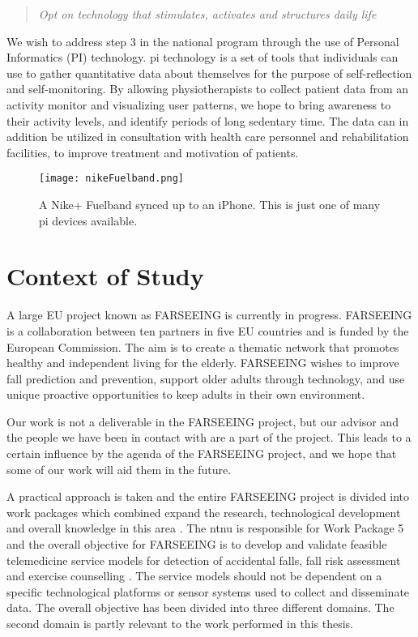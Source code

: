 \begin{quote}
\textit{Opt on technology that stimulates, activates and structures daily life}~\cite[page 120]{haagen}
\end{quote}

We wish to address step 3 in the national program through the use of Personal Informatics (PI) technology. \gls{pi} technology is a set of tools that individuals can use to gather quantitative data about themselves for the purpose of self-reflection and self-monitoring. By allowing physiotherapists to collect patient data from an activity monitor and visualizing user patterns, we hope to bring awareness to their activity levels, and identify periods of long sedentary time. The data can in addition be utilized in consultation with health care personnel and rehabilitation facilities, to improve treatment and motivation of patients.


\begin{figure}[h!]
	\centering
		\texttt{[image: nikeFuelband.png]}
		\caption{\footnotesize A Nike+ Fuelband synced up to an iPhone. This is just one of many \gls{pi} devices available.}
		\label{fig:nikeFuelbandPhone}
\end{figure}

\section{Context of Study}
A large EU project known as FARSEEING is currently in progress. FARSEEING is a collaboration between ten partners in five EU countries and is funded by the European Commission. The aim is to create a thematic network that promotes healthy and independent living for the elderly. FARSEEING wishes to improve fall prediction and prevention, support older adults through technology, and use unique proactive opportunities to keep adults in their own environment.

Our work is not a deliverable in the FARSEEING project, but our advisor and the people we have been in contact with are a part of the project. This leads to a certain influence by the agenda of the FARSEEING project, and we hope that some of our work will aid them in the future.

A practical approach is taken and the entire FARSEEING project is divided into work packages which combined expand the research, technological development and overall knowledge in this area \cite{farseeing}. The \gls{ntnu} is responsible for Work Package 5 and the overall objective for FARSEEING is to develop and validate feasible telemedicine service models for detection of accidental falls, fall risk assessment and exercise counselling \cite{wp5}. The service models should not be dependent on a specific technological platforms or sensor systems used to collect and disseminate data. The overall objective has been divided into three different domains. The second domain is partly relevant to the work performed in this thesis.

